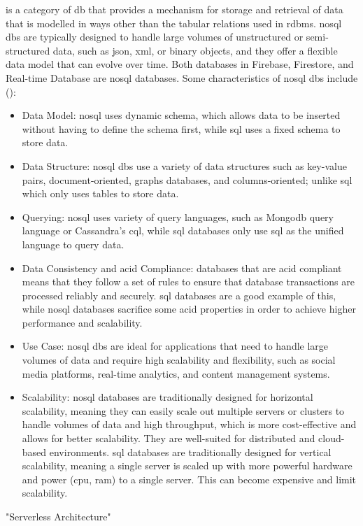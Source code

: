 \begin{multicols}{2}
      is a category of \acrshort{db} that provides a mechanism for storage and retrieval of data that is modelled in ways other
      than the tabular relations used in \acrshort{rdbms}. \acrshort{nosql} \acrshort{db}s are typically designed to handle large
      volumes of unstructured or semi-structured data, such as \acrshort{json}, \acrshort{xml}, or binary objects, and they offer
      a flexible data model that can evolve over time. Both databases in Firebase, Firestore, and Real-time Database are \acrshort{nosql}
      databases. Some characteristics of \acrshort{nosql} \acrshort{db}s include (\cite{nosql}):
      \begin{itemize}
            \item Data Model: \acrshort{nosql} uses dynamic schema, which allows data to be inserted without having to define the schema
                  first, while \acrshort{sql} uses a fixed schema to store data.
            \item Data Structure: \acrshort{nosql} \acrshort{db}s use a variety of data structures such as key-value pairs, document-oriented,
                  graphs databases, and columns-oriented; unlike \acrshort{sql} which only uses tables to store data.
            \item Querying: \acrshort{nosql} uses variety of query languages, such as Mongo\acrshort{db} query language or Cassandra's
                  \acrshort{cql}, while \acrshort{sql} databases only use \acrshort{sql} as the unified language to query data.
            \item Data Consistency and \acrshort{acid} Compliance: databases that are \acrshort{acid} compliant means that they follow a
                  set of rules to ensure that database transactions are processed reliably and securely. \acrshort{sql} databases are a
                  good example of this, while \acrshort{nosql} databases sacrifice some \acrshort{acid} properties in order to achieve
                  higher performance and scalability.
            \item Use Case: \acrshort{nosql} \acrshort{db}s are ideal for applications that need to handle large volumes of data and
                  require high scalability and flexibility, such as social media platforms, real-time analytics, and content management
                  systems.
            \item Scalability: \acrshort{nosql} databases are traditionally designed for horizontal scalability, meaning they can easily
                  scale out multiple servers or clusters to handle volumes of data and high throughput, which is more cost-effective and
                  allows for better scalability. They are well-suited for distributed and cloud-based environments. \acrshort{sql} databases
                  are traditionally designed for vertical scalability, meaning a single server is scaled up with more powerful hardware and
                  power (\acrshort{cpu}, \acrshort{ram}) to a single server. This can become expensive and limit scalability.
      \end{itemize}
      "Serverless Architecture"
\end{multicols}

